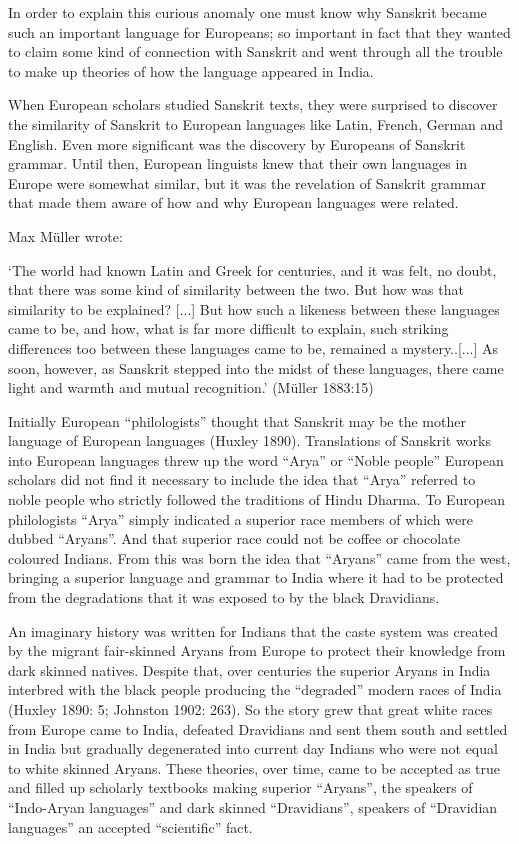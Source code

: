 In order to explain this curious anomaly one must know why Sanskrit became such an important language for Europeans; so important in fact that they wanted to claim some kind of connection with Sanskrit and went through all the trouble to make up theories of how the language appeared in India.

When European scholars studied Sanskrit texts, they were surprised to discover the similarity of Sanskrit to European languages like Latin, French, German and English. Even more significant was the discovery by Europeans of Sanskrit grammar. Until then, European linguists knew that their own languages in Europe were somewhat similar, but it was the revelation of Sanskrit grammar that made them aware of how and why European languages were related.

Max Müller wrote:

\begin{myquote}
‘The world had known Latin and Greek for centuries, and it was felt, no doubt, that there was some kind of similarity between the two. But how was that similarity to be explained? [...] But how such a likeness between these languages came to be, and how, what is far more difficult to explain, such striking differences too between these languages came to be, remained a mystery..[...] As soon, however, as Sanskrit stepped into the midst of these languages, there came light and warmth and mutual recognition.’ (Müller 1883:15)
\end{myquote}

Initially European “philologists” thought that Sanskrit may be the mother language of European languages (Huxley 1890). Translations of Sanskrit works into European languages threw up the word “Arya” or “Noble people” European scholars did not find it necessary to include the idea that “Arya” referred to noble people who strictly followed the traditions of Hindu Dharma. To European philologists “Arya” simply indicated a superior race members of which were dubbed “Aryans”. And that superior race could not be coffee or chocolate coloured Indians. From this was born the idea that “Aryans” came from the west, bringing a superior language and grammar to India where it had to be protected from the degradations that it was exposed to by the black Dravidians. 

An imaginary history was written for Indians that the caste system was created by the migrant fair-skinned Aryans from Europe to protect their knowledge from dark skinned natives. Despite that, over centuries the superior Aryans in India interbred with the black people producing the “degraded” modern races of India (Huxley 1890: 5; Johnston 1902: 263). So the story grew that great white races from Europe came to India, defeated Dravidians and sent them south and settled in India but gradually degenerated into current day Indians who were not equal to white skinned Aryans. These theories, over time, came to be accepted as true and filled up scholarly textbooks making superior “Aryans”, the speakers of “Indo-Aryan languages” and dark skinned “Dravidians”, speakers of “Dravidian languages” an accepted “scientific” fact.

